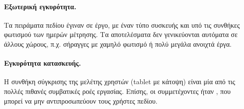 \paragraph{Εξωτερική εγκυρότητα.} Τα πειράματα πεδίου έγιναν σε  έργο, με έναν τύπο συσκευής και υπό τις συνθήκες φωτισμού των ημερών μέτρησης. Τα αποτελέσματα δεν γενικεύονται αυτόματα σε άλλους χώρους, π.χ. σήραγγες με χαμηλό φωτισμό ή πολύ μεγάλα ανοιχτά έργα.

\paragraph{Εγκυρότητα κατασκευής.} Η συνθήκη σύγκρισης της μελέτης χρηστών (tablet με κάτοψη) είναι μία από τις πολλές πιθανές συμβατικές ροές εργασίας. Επίσης, οι συμμετέχοντες ήταν , που μπορεί να μην αντιπροσωπεύουν τους χρήστες πεδίου.
